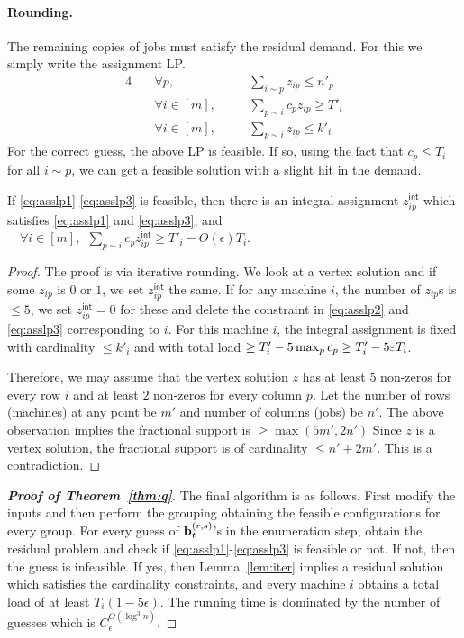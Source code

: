 \paragraph{Rounding.}
The remaining copies of jobs must satisfy the residual demand. For this we simply write the assignment LP.
\begin{alignat}{4}
	& \quad \forall p,   &&\quad  \textstyle \sum_{i\sim p} z_{ip} \leq n'_p \label{eq:asslp1} \\
	& \quad \forall i\in [m] ,  &&\quad  \textstyle \sum_{p\sim i} c_pz_{ip}  \geq T'_i \label{eq:asslp2}\\
	& \quad \forall i\in [m], && \quad \textstyle \sum_{p\sim i} z_{ip}  \leq  k'_i \label{eq:asslp3}
\end{alignat}
\def\zz{z^{\mathsf{int}}}
For the correct guess, the above LP is feasible. If so, using the fact that $c_p \leq T_i$ for all $i\sim p$, we can get a feasible solution with a slight hit in the demand.
\begin{lemma}\label{lem:iter}
If \eqref{eq:asslp1}-\eqref{eq:asslp3} is feasible, then there is an integral assignment $\zz_{ip}$ which satisfies \eqref{eq:asslp1} and \eqref{eq:asslp3}, and 
$\quad \forall i\in [m], ~~ \sum_{p\sim i} c_p\zz_{ip}  \geq T'_i - O(\epsilon)T_i$.
\end{lemma}
\begin{proof}
The proof is via iterative rounding. We look at a vertex solution and if some $z_{ip}$ is $0$ or $1$, we set $\zz_{ip}$ the same. 
If for any machine $i$, the number of $z_{ip}$s is $\leq 5$, we set $\zz_{ip} = 0$ for these and delete the constraint in \eqref{eq:asslp2} and \eqref{eq:asslp3} corresponding to $i$.
For this machine $i$, the integral assignment is fixed with cardinality $\le k'_i$ and with total load $\geq T'_i - 5\max_p c_p \geq T'_i - 5\varepsilon T_i$.

Therefore, we may assume that the vertex solution $z$ has at least $5$ non-zeros for every row $i$ and at least $2$ non-zeros for every column $p$.
Let the number of rows (machines) at any point be $m'$ and number of columns (jobs) be $n'$.  The above observation implies the fractional support is $\geq \max(5m',2n')$ 
Since $z$ is a vertex solution, the fractional support is of cardinality $\leq n' + 2m'$.
This is a contradiction.
\end{proof}
\begin{proof}[{\bf Proof of Theorem~\ref{thm:q}}]
The final algorithm is as follows.
First modify the inputs and then perform the grouping obtaining the feasible configurations for every group.
For every guess of $\mathbf{b}^{(r,s)}_t$'s in the enumeration step, obtain the residual problem and check if \eqref{eq:asslp1}-\eqref{eq:asslp3} is feasible or not. If not, then the guess is infeasible.
If yes, then Lemma~\ref{lem:iter} implies a residual solution which satisfies the cardinality constraints, and every machine $i$ obtains a total load of at least $T_i (1 - 5\epsilon)$. 
The running time is dominated by the number of guesses which is $C_\epsilon^{O(\log^3 n)}$.
\end{proof}



